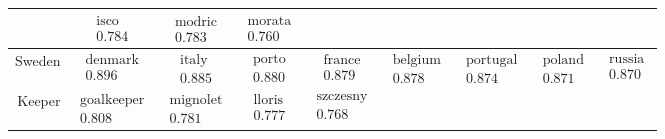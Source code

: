 \documentclass{beamer}
\begin{document}
\begin{frame}
\begin{tabular}{r|c c c c c c c c}
 & $\begin{matrix}\text{isco}\\0.784\end{matrix}$
 & $\begin{matrix}\text{modric}\\0.783\end{matrix}$
 & $\begin{matrix}\text{morata}\\0.760\end{matrix}$
 \\\hline
Sweden
 & $\begin{matrix}\text{denmark}\\0.896\end{matrix}$
 & $\begin{matrix}\text{italy}\\0.885\end{matrix}$
 & $\begin{matrix}\text{porto}\\0.880\end{matrix}$
 & $\begin{matrix}\text{france}\\0.879\end{matrix}$
 & $\begin{matrix}\text{belgium}\\0.878\end{matrix}$
 & $\begin{matrix}\text{portugal}\\0.874\end{matrix}$
 & $\begin{matrix}\text{poland}\\0.871\end{matrix}$
 & $\begin{matrix}\text{russia}\\0.870\end{matrix}$
 \\\hline
Keeper
 & $\begin{matrix}\text{goalkeeper}\\0.808\end{matrix}$
 & $\begin{matrix}\text{mignolet}\\0.781\end{matrix}$
 & $\begin{matrix}\text{lloris}\\0.777\end{matrix}$
 & $\begin{matrix}\text{szczesny}\\0.768\end{matrix}$

\end{tabular}
\end{frame}
\end{document}
